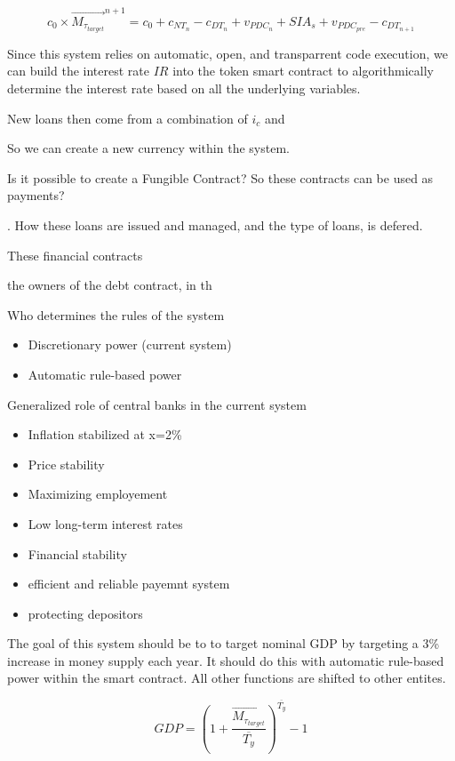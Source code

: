 \begin{equation}
    c_{0} \times \overrightarrow{M_{\tau_{target}}}^{n+1} = c_{0} + c_{NT_{n}} - c_{DT_{n}} + v_{PDC_{n}} + SIA_{s} + v_{PDC_{pre}} - c_{DT_{n+1}}
\end{equation}







Since this system relies on automatic, open, and transparrent code execution, we can build the interest rate $IR$ into the token smart contract to algorithmically determine the interest rate based on all the underlying variables. 











New loans then come from a combination of $i_{c}$ and



So we can create a new currency within the system. 




Is it possible to create a Fungible Contract? So these contracts can be used as payments? 




. How these loans are issued and managed, and the type of loans, is defered. 

These financial contracts 


 the owners of the debt contract, in th


Who determines the rules of the system
\begin{itemize}
    \item Discretionary power (current system)
    \item Automatic rule-based power
\end{itemize}

Generalized role of central banks in the current system \cite{Stellinga2021}
\begin{itemize}
    \item Inflation stabilized at x=2\%
    \item Price stability
    \item Maximizing employement
    \item Low long-term interest rates
    \item Financial stability
    \item efficient and reliable payemnt system
    \item protecting depositors 
\end{itemize}

The goal of this system should be to to target nominal GDP by targeting a 3\% increase in money supply each year. It should do this with automatic rule-based power within the smart contract. All other functions are shifted to other entites. 

\begin{equation}
    GDP = (1+\frac{\overrightarrow{M_{\tau_{target}}}}{\overline{T_{y}}})^{\overline{T_{y}}} - 1
\end{equation}